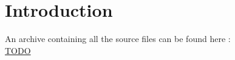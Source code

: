 \section{Introduction}

\begin{framehint}
    An archive containing all the source files can be found here :\\
    \href{TODO}{TODO} %
\end{framehint}
